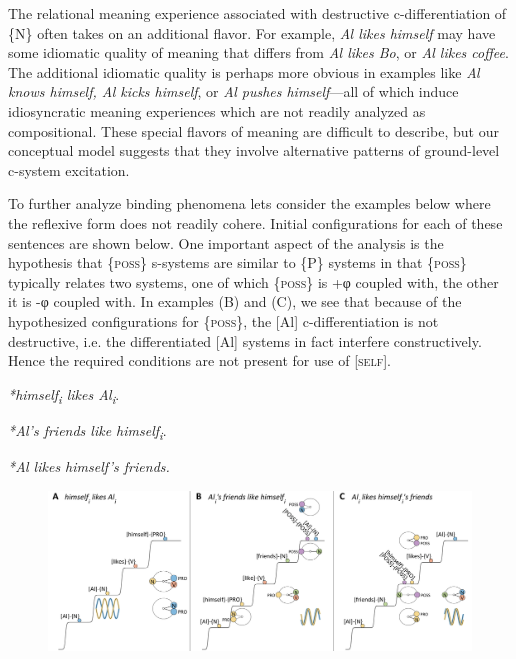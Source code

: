   The relational meaning experience associated with destructive c-differentiation of \{N\} often takes on an additional flavor. For example, \textit{Al likes himself} may have some idiomatic quality of meaning that differs from \textit{Al likes Bo}, or \textit{Al likes coffee}. The additional idiomatic quality is perhaps more obvious in examples like \textit{Al knows himself, Al kicks himself}, or \textit{Al pushes himself}—all of which induce idiosyncratic meaning experiences which are not readily analyzed as compositional. These special flavors of meaning are difficult to describe, but our conceptual model suggests that they involve alternative patterns of ground-level c-system excitation.

  To further analyze binding phenomena lets consider the examples below where the reflexive form does not readily cohere. Initial configurations for each of these sentences are shown below. One important aspect of the analysis is the hypothesis that \{\textsc{poss}\} s-systems are similar to \{P\} systems in that \{\textsc{poss}\} typically relates two systems, one of which \{\textsc{poss}\} is +φ coupled with, the other it is -φ coupled with. In examples (B) and (C), we see that because of the hypothesized configurations for \{\textsc{poss}\}, the [Al] c-differentiation is not destructive, i.e. the differentiated [Al] systems in fact interfere constructively. Hence the required conditions are not present for use of [\textsc{self}]. 

\textit{*himself\textsubscript{i} likes Al\textsubscript{i}}.

\textit{*Al’s friends like himself\textsubscript{i}}.

\textit{*Al likes himself’s friends.}

  
\begin{figure}
\includegraphics[width=\textwidth]{figures/Tilsen-img157.png}
\caption{\missingcaption}
\label{fig:}
\end{figure}
 


